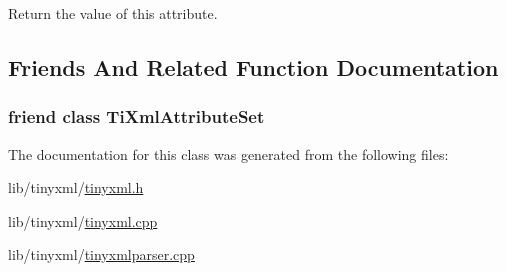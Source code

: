 Return the value of this attribute. 



\subsection{Friends And Related Function Documentation}
\hypertarget{class_ti_xml_attribute_a35a7b7f89f708527677d5078d41ce0bf}{
\subsubsection[{Ti\-Xml\-Attribute\-Set}]{\setlength{\rightskip}{0pt plus 5cm}friend class {\bf Ti\-Xml\-Attribute\-Set}\hspace{0.3cm}{\ttfamily [friend]}}}\label{class_ti_xml_attribute_a35a7b7f89f708527677d5078d41ce0bf}


The documentation for this class was generated from the following files\-:\begin{DoxyCompactItemize}
\item 
lib/tinyxml/\hyperlink{tinyxml_8h}{tinyxml.\-h}\item 
lib/tinyxml/\hyperlink{tinyxml_8cpp}{tinyxml.\-cpp}\item 
lib/tinyxml/\hyperlink{tinyxmlparser_8cpp}{tinyxmlparser.\-cpp}\end{DoxyCompactItemize}
